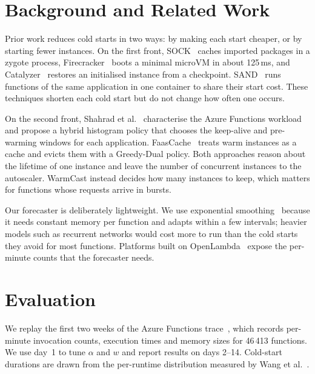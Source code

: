 \documentclass[10pt]{article}
\begin{document}
\section{Background and Related Work}
\label{sec:related}

Prior work reduces cold starts in two ways: by making each start
cheaper, or by starting fewer instances. On the first front,
SOCK~\cite{oakes2018sock} caches imported packages in a zygote
process, Firecracker~\cite{agache2020firecracker} boots a minimal
microVM in about 125\,ms, and Catalyzer~\cite{du2020catalyzer}
restores an initialised instance from a checkpoint.
SAND~\cite{akkus2018sand} runs functions of the same application in
one container to share their start cost. These techniques shorten
each cold start but do not change how often one occurs.

On the second front, Shahrad et al.~\cite{shahrad2020serverless} characterise
the Azure Functions workload and propose a hybrid histogram policy that
chooses the keep-alive and pre-warming windows for each application.
FaasCache~\cite{fuerst2021faascache} treats warm instances as a cache and
evicts them with a Greedy-Dual policy. Both approaches reason about the
lifetime of one instance and leave the number of concurrent instances to the
autoscaler. WarmCast instead decides how many instances to keep,
which matters for functions whose requests arrive in bursts.

Our forecaster is deliberately lightweight. We use exponential
smoothing~\cite{hyndman2021forecasting} because it needs constant memory per
function and adapts within a few intervals; heavier models such as recurrent
networks would cost more to run than the cold starts they avoid for most
functions. Platforms built on OpenLambda~\cite{hendrickson2016openlambda}
expose the per-minute counts that the forecaster needs.



\section{Evaluation}
\label{sec:eval}

We replay the first two weeks of the Azure Functions
trace~\cite{shahrad2020serverless}, which records per-minute invocation
counts, execution times and memory sizes for 46\,413 functions. We use day~1
to tune $\alpha$ and $w$ and report results on days 2--14. Cold-start
durations are drawn from the per-runtime distribution measured by Wang et
al.~\cite{wang2018peeking}.
\end{document}
